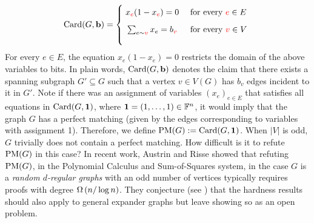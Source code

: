 \documentclass[11pt]{article}
\begin{document}
\[
        \Card{G, \vec{b}}=
        \Bigger[10]\{\begin{array}{@{}cl}
                x_{\highlight{e}}(1 - x_{\highlight{e}}) = 0 & \text{ for every $\highlight{e} \in E$}\\[3mm]
                \sum_{e \sim \highlight{v}} x_e = b_{\highlight{v}} & \text{ for every $\highlight{v} \in V$} \\[3mm]
        \end{array}
\]
For every $e \in E$, the equation $x_e(1 - x_e) = 0$ restricts the domain of the above variables to bits.
In plain words, $\text{Card}(G, \mathbf{b})$ denotes the claim that there exists a spanning subgraph $G' \subseteq G$ such that a vertex $v \in V(G)$ has $b_v$ edges incident to it in $G'$.
Note if there was an assignment of variables $(x_e)_{e \in E}$ that satisfies all equations in $\text{Card}(G, \mathbf{1})$, where $\mathbf{1} = (1, \ldots, 1) \in \mathbb{F}^{n}$, it would imply that the graph $G$ has a perfect matching (given by the edges corresponding to variables with assignment 1).
Therefore, we define $\text{PM}(G) := \text{Card}(G, \mathbf{1})$.
When $|V|$ is odd, $G$ trivially does not contain a perfect matching. How difficult is it to refute $\text{PM}(G)$ in this case? In recent work, Austrin and Risse \cite{Austrin_2022} showed that refuting $\text{PM}(G)$, in the Polynomial Calculus  and Sum-of-Squares system, in the case $G$ is a \emph{random $d$-regular graphs} with an odd number of vertices typically requires proofs with degree $\Omega\left(n/\log n\right)$.
They conjecture (see \citep[Section 6]{Austrin_2022}) that the hardness results should also apply to general expander graphs but leave showing so as an open problem.
\end{document}
